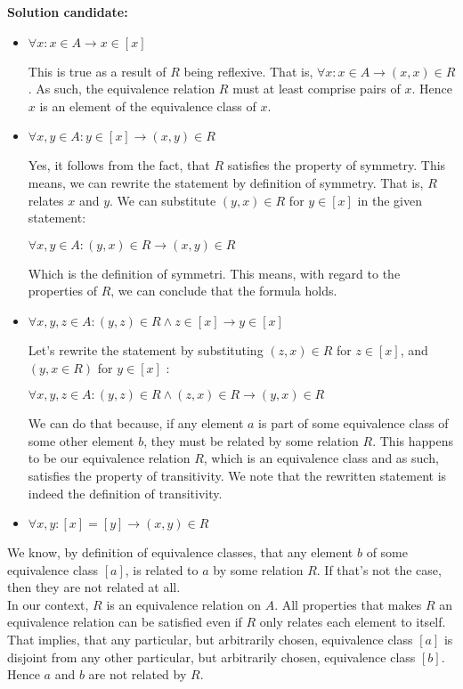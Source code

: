 \documentclass{report}
\newcommand{\cent}[1]{\begin{center}#1\end{center}}
\newcommand{\In}{\! \in \!}
\newcommand{\Solution}{\textbf{Solution candidate: }}
\begin{document}
	\Solution
	\begin{itemize}
		\item $\forall x : x \In A \to x \In [x]$
		
		This is true as a result of $R$ being reflexive. That is, $\forall x : x \In A \to (x,x) \In R$. As such, the equivalence relation $R$ must at least comprise pairs of $x$. Hence $x$ is an element of the equivalence class of $x$.
		
		\item $\forall x,y \In A : y \In [x] \to (x,y) \In R$
		
		Yes, it follows from the fact, that $R$ satisfies the property of symmetry. This means, we can rewrite the statement by definition of symmetry. That is, $R$ relates $x$ and $y$. We can substitute $(y,x)\In R$ for $y \In [x]$ in the given statement:
		
		\cent{$\forall x,y \In A : (y,x) \In R \to (x,y) \In R$}
		
		Which is the definition of symmetri. This means, with regard to the properties of $R$, we can conclude that the formula holds.
		
		\item $\forall x,y,z \In A : (y,z) \In R \wedge z \In [x] \to y \In [x]$
		
		Let's rewrite the statement by substituting $(z,x)\In R$ for $z \In [x]$, and $(y,x \In R)$ for $y \In [x]$ :
		
		\cent{$\forall x,y,z \In A : (y,z) \In R \wedge (z,x)\In R \to (y,x) \In R$}
		
		We can do that because, if any element $a$ is part of some equivalence class of some other element $b$, they must be related by some relation $R$. This happens to be our equivalence relation $R$, which is an equivalence class and as such, satisfies the property of transitivity. We note that the rewritten statement is indeed the definition of transitivity.
		
		\item $\forall x,y : [x] = [y] \to (x,y)\In R$
	\end{itemize}
		
	We know, by definition of equivalence classes, that any element $b$ of some equivalence class $[a]$, is related to $a$ by some relation $R$. If that's not the case, then they are not related at all.\\ 
	
	In our context, $R$ is an equivalence relation on $A$. All properties that makes $R$ an equivalence relation can be satisfied even if $R$ only relates each element to itself. That implies, that any particular, but arbitrarily chosen, equivalence class $[a]$ is disjoint from any other particular, but arbitrarily chosen, equivalence class $[b]$. Hence $a$ and $b$ are not related by $R$.\\
	
\end{document}
